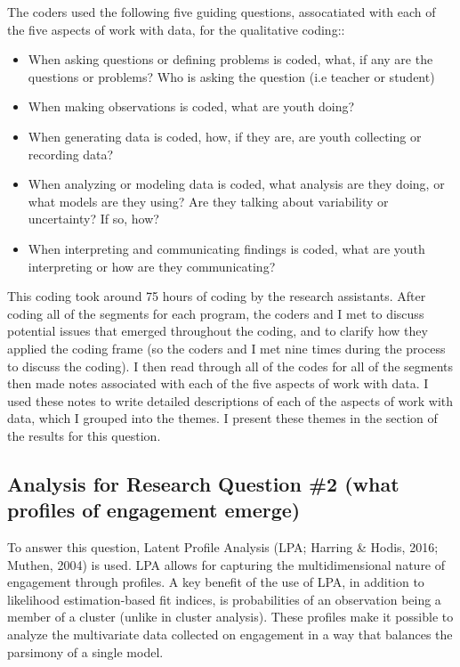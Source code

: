 \documentclass[]{book}
\providecommand{\tightlist}{%
  \setlength{\itemsep}{0pt}\setlength{\parskip}{0pt}}
\theoremstyle{definition}
\theoremstyle{definition}
\theoremstyle{definition}
\theoremstyle{remark}
\begin{document}
The coders used the following five guiding questions, assocatiated with
each of the five aspects of work with data, for the qualitative coding::

\begin{itemize}
\tightlist
\item
  When asking questions or defining problems is coded, what, if any are
  the questions or problems? Who is asking the question (i.e teacher or
  student)
\item
  When making observations is coded, what are youth doing?
\item
  When generating data is coded, how, if they are, are youth collecting
  or recording data?
\item
  When analyzing or modeling data is coded, what analysis are they
  doing, or what models are they using? Are they talking about
  variability or uncertainty? If so, how?
\item
  When interpreting and communicating findings is coded, what are youth
  interpreting or how are they communicating?
\end{itemize}

This coding took around 75 hours of coding by the research assistants.
After coding all of the segments for each program, the coders and I met
to discuss potential issues that emerged throughout the coding, and to
clarify how they applied the coding frame (so the coders and I met nine
times during the process to discuss the coding). I then read through all
of the codes for all of the segments then made notes associated with
each of the five aspects of work with data. I used these notes to write
detailed descriptions of each of the aspects of work with data, which I
grouped into the themes. I present these themes in the section of the
results for this question.

\subsection{Analysis for Research Question \#2 (what profiles of
engagement
emerge)}\label{analysis-for-research-question-2-what-profiles-of-engagement-emerge}

To answer this question, Latent Profile Analysis (LPA; Harring \& Hodis,
2016; Muthen, 2004) is used. LPA allows for capturing the
multidimensional nature of engagement through profiles. A key benefit of
the use of LPA, in addition to likelihood estimation-based fit indices,
is probabilities of an observation being a member of a cluster (unlike
in cluster analysis). These profiles make it possible to analyze the
multivariate data collected on engagement in a way that balances the
parsimony of a single model.
\end{document}
